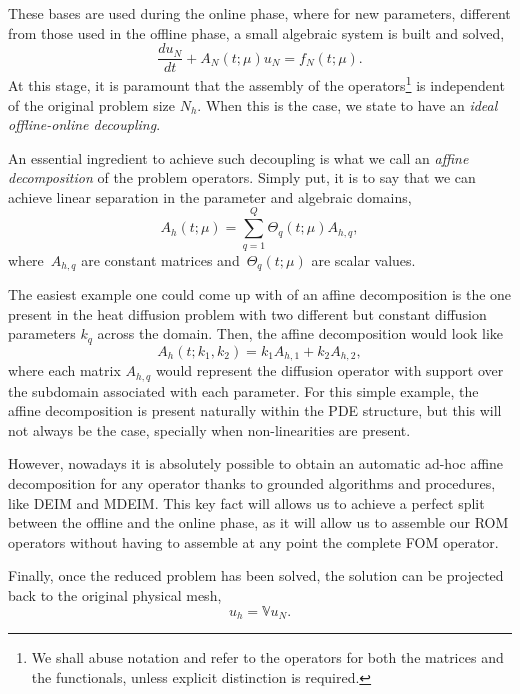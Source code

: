 \documentclass[../main.tex]{subfiles}
\begin{document}
These bases are used during the online phase, where for new parameters, different from those used in the offline phase, a small algebraic system is built and solved,
\begin{equation*}
   \frac{du_N}{dt} + A_N\left(t;\mu\right) u_N = f_N\left(t;\mu\right).
\end{equation*}
At this stage, it is paramount that the assembly of the operators\footnote{
   We shall abuse notation and refer to the operators for both the matrices and the functionals, unless explicit distinction is required.
} 
is independent of the original problem size $N_h$.
When this is the case, we state to have an \textit{
   ideal offline-online decoupling}.

An essential ingredient to achieve such decoupling is what we call an \textit{
   affine decomposition} 
of the problem operators.
Simply put, it is to say that we can achieve linear separation in the parameter and algebraic domains, 
\begin{equation*}
   A_h\left(t;\mu\right) = \sum_{q=1}^{Q} \Theta_{q}(t;\mu) A_{h,q},
\end{equation*}
where~$A_{h,q}$ are constant matrices and~$\Theta_{q}(t;\mu)$ are scalar values. 

The easiest example one could come up with of an affine decomposition is the one present in the heat diffusion problem with two different but constant diffusion parameters $k_q$ across the domain.
Then, the affine decomposition would look like
\begin{equation*}
   A_h\left(t;k_1, k_2\right) = k_{1} A_{h,1} + k_{2} A_{h,2},
\end{equation*}
where each matrix $A_{h,q}$ would represent the diffusion operator with support over the subdomain associated with each parameter. 
For this simple example, the affine decomposition is present naturally within the PDE structure, but this will not always be the case, specially when non-linearities are present. 

However, nowadays it is absolutely possible to obtain an automatic ad-hoc affine decomposition for any operator thanks to grounded algorithms and procedures, like DEIM and MDEIM.
This key fact will allows us to achieve a perfect split between the offline and the online phase, as it will allow us to assemble our ROM operators without having to assemble at any point the complete FOM operator. 

Finally, once the reduced problem has been solved, the solution can be projected back to the original physical mesh,
\begin{equation*}
   u_h = \mathbb{V} u_N.
\end{equation*}
\end{document}
